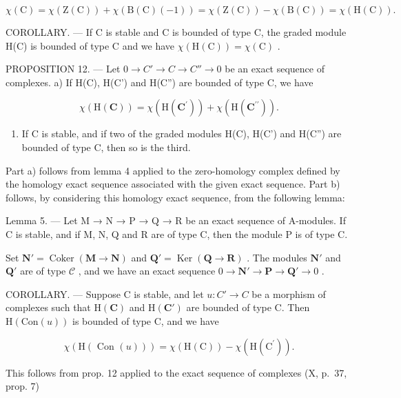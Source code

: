 \[
\chi (\mathrm{C}) = \chi (\mathrm{Z} (\mathrm{C})) + \chi (\mathrm{B} (\mathrm{C}) (- 1)) = \chi (\mathrm{Z} (\mathrm{C})) - \chi (\mathrm{B} (\mathrm{C})) = \chi (\mathrm{H} (\mathrm{C})).
\]

COROLLARY. --- If C is stable and C is bounded of type C, the graded module H(C) is bounded of type C and we have \(\chi(\mathrm{H}(\mathrm{C})) = \chi(\mathrm{C})\) .

PROPOSITION 12. --- Let \(0 \to C' \to C \to C'' \to 0\) be an exact sequence of complexes. a) If H(C), H(C') and H(C'') are bounded of type C, we have

\[
\chi (\mathrm{H} (\mathbf {C})) = \chi (\mathrm{H} (\mathbf {C} ^ {\prime})) + \chi (\mathrm{H} (\mathbf {C} ^ {\prime \prime})) .
\]

\begin{enumerate}
\def\labelenumi{\alph{enumi})}
\setcounter{enumi}{1}
\tightlist
\item
  If C is stable, and if two of the graded modules H(C), H(C') and H(C'') are bounded of type C, then so is the third.
\end{enumerate}

Part a) follows from lemma 4 applied to the zero-homology complex defined by the homology exact sequence associated with the given exact sequence. Part b) follows, by considering this homology exact sequence, from the following lemma:

Lemma 5. --- Let M → N → P → Q → R be an exact sequence of A-modules. If C is stable, and if M, N, Q and R are of type C, then the module P is of type C.

Set \(\mathbf{N}' = \operatorname{Coker} (\mathbf{M} \to \mathbf{N})\) and \(\mathbf{Q}' = \operatorname{Ker} (\mathbf{Q} \to \mathbf{R})\) . The modules \(\mathbf{N}'\) and \(\mathbf{Q}'\) are of type \(\mathcal{C}\) , and we have an exact sequence \(0 \to \mathbf{N}' \to \mathbf{P} \to \mathbf{Q}' \to 0\) .

COROLLARY. --- Suppose C is stable, and let \(u : C' \to C\) be a morphism of complexes such that \(\mathrm{H}(\mathbf{C})\) and \(\mathrm{H}(\mathbf{C}')\) are bounded of type C. Then \(\mathrm{H}(\mathrm{Con}(u))\) is bounded of type C, and we have

\[
\chi (\mathrm{H} (\text { Con } (u))) = \chi (\mathrm{H} (\mathrm{C})) - \chi (\mathrm{H} (\mathrm{C} ^ {\prime})) .
\]

This follows from prop. 12 applied to the exact sequence of complexes (X, p.~37, prop. 7)


